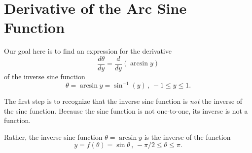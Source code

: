 \documentclass{ximera}
\begin{document}
\section{Derivative of the Arc Sine Function}

Our goal here is to find an expression for the derivative
\[
       \frac{d\theta}{dy} = \frac{d}{dy} \left(   \arcsin y \right)
\]
of the inverse sine function
\[
       \theta = \arcsin y = \sin^{-1}(y) \, , \, -1 \leq y \leq 1.
\]

The first step is to recognize that the inverse sine function is \emph{not} the inverse of the sine function. Because the sine function is not one-to-one, its inverse is not a function.

Rather, the inverse sine function $\theta = \arcsin y$ is the inverse of the function
\[
  y = f(\theta) = \sin\theta \, , \, -\pi/2 \leq \theta \leq \pi.
\]
\end{document}
